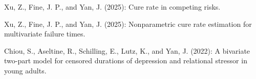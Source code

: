 \begin{CVUnderReview}
\item *Xu, Z., Fine, J. P., and Yan, J. (2025): Cure rate in
competing risks.

\item *Xu, Z., Fine, J. P., and Yan, J. (2025): Nonparametric cure
rate estimation for multivariate failure times.

\item *Chiou, S., Aseltine, R., Schilling, E., Lutz, K., and Yan,
J. (2022): A bivariate two-part model for censored durations of
depression and relational stressor in young adults.

\end{CVUnderReview}
